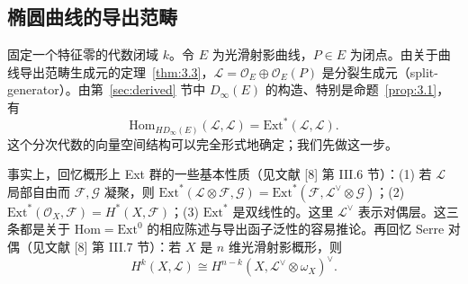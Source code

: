 
\subsection{椭圆曲线的导出范畴}\label{subsec:6.2}

固定一个特征零的代数闭域 $k$。令 $E$ 为光滑射影曲线，$P\in E$ 为闭点。由关于曲线导出范畴生成元的定理~\ref{thm:3.3}，$\mathcal{L}=\mathcal{O}_E\oplus\mathcal{O}_E(P)$ 是分裂生成元（split-generator）。由第~\ref{sec:derived} 节中 $D_\infty(E)$ 的构造、特别是命题~\ref{prop:3.1}，有
\[
\mathrm{Hom}_{HD_\infty(E)}(\mathcal{L},\mathcal{L})=\mathrm{Ext}^*(\mathcal{L},\mathcal{L}).
\]
这个分次代数的向量空间结构可以完全形式地确定；我们先做这一步。


事实上，回忆概形上 Ext 群的一些基本性质（见文献 [8] 第 III.6 节）：(1) 若 $\mathcal{L}$ 局部自由而 $\mathcal{F},\mathcal{G}$ 凝聚，则 $\mathrm{Ext}^*(\mathcal{L}\otimes\mathcal{F},\mathcal{G})=\mathrm{Ext}^*(\mathcal{F},\mathcal{L}^{\vee}\otimes\mathcal{G})$；(2) $\mathrm{Ext}^*(\mathcal{O}_X,\mathcal{F})=H^*(X,\mathcal{F})$；(3) $\mathrm{Ext}^*$ 是双线性的。这里 $\mathcal{L}^{\vee}$ 表示对偶层。这三条都是关于 $\mathrm{Hom}=\mathrm{Ext}^0$ 的相应陈述与导出函子泛性的容易推论。再回忆 Serre 对偶（见文献 [8] 第 III.7 节）：若 $X$ 是 $n$ 维光滑射影概形，则
\[
H^k(X,\mathcal{L})\cong H^{n-k}(X,\mathcal{L}^{\vee}\otimes\omega_X)^{\vee}.
\]

